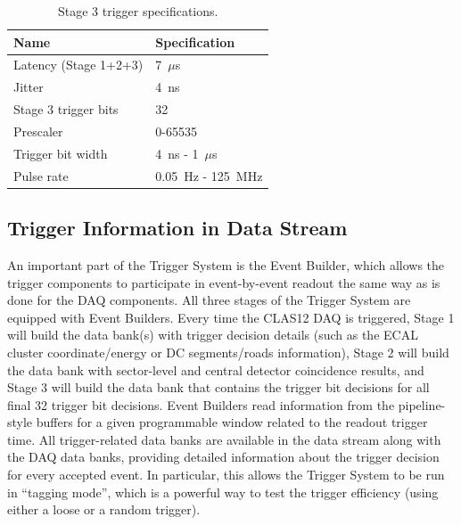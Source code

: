 \begin{table}
\begin{center}
	\begin{tabular}{| l | l |}
		\hline \hline
		Name				& Specification	\\
		\hline
		Latency (Stage 1+2+3)		& 7~$\mu$s	\\
		Jitter				& 4~ns		\\
		Stage 3 trigger bits		& 32		\\
		Prescaler			& 0-65535	\\
		Trigger bit width		& 4~ns - 1~$\mu$s	\\
		Pulse rate			& 0.05~Hz - 125~MHz	\\
		\hline \hline
	\end{tabular}
\end{center}
\caption{Stage 3 trigger specifications.}
\label{tab:stage_3_specs}
\end{table}


\subsection{Trigger Information in Data Stream}
\label{sec:trigger_in_datastream}

An important part of the Trigger System is the Event Builder, which allows the trigger components to participate in event-by-event readout the same way as is done for the DAQ components. All three stages of the Trigger System are equipped with Event Builders. Every time the CLAS12 DAQ is triggered, Stage 1 will build the data bank(s) with trigger decision details (such as the ECAL cluster coordinate/energy or DC segments/roads information), Stage 2 will build the data bank with sector-level and central detector coincidence results, and Stage 3 will build the data bank that contains the trigger bit decisions for all final 32 trigger bit decisions. Event Builders read information from the pipeline-style buffers for a given programmable window related to the readout trigger time. All trigger-related data banks are available in the data stream along with the DAQ data banks, providing detailed information about the trigger decision for every accepted event. In particular, this allows the Trigger System to be run in ``tagging mode'', which is a powerful way to test the trigger efficiency (using either a loose or a random trigger).


